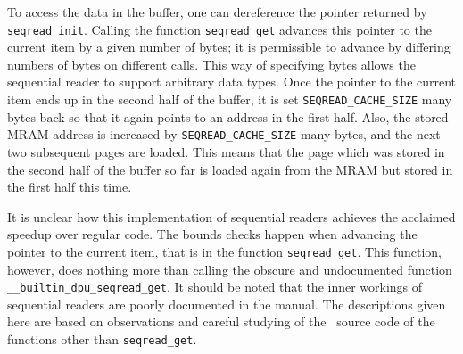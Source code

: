 To access the data in the buffer, one can dereference the pointer returned by \lstinline|seqread_init|.
Calling the function \lstinline|seqread_get| advances this pointer to the current item by a given number of bytes;
it is permissible to advance by differing numbers of bytes on different calls.
This way of specifying bytes allows the sequential reader to support arbitrary data types.
Once the pointer to the current item ends up in the second half of the buffer, it is set \lstinline|SEQREAD_CACHE_SIZE| many bytes back so that it again points to an address in the first half.
Also, the stored MRAM address is increased by \lstinline|SEQREAD_CACHE_SIZE| many bytes, and the next two subsequent pages are loaded.
This means that the page which was stored in the second half of the buffer so far is loaded again from the MRAM but stored in the first half this time.

It is unclear how this implementation of sequential readers achieves the acclaimed speedup over regular \langC{} code.
The bounds checks happen when advancing the pointer to the current item, that is in the function \lstinline|seqread_get|.
This function, however, does nothing more than calling the obscure and undocumented function \lstinline|__builtin_dpu_seqread_get|.
It should be noted that the inner workings of sequential readers are poorly documented in the manual.
The descriptions given here are based on observations and careful studying of the \langC{}~source code of the functions other than \lstinline|seqread_get|.
